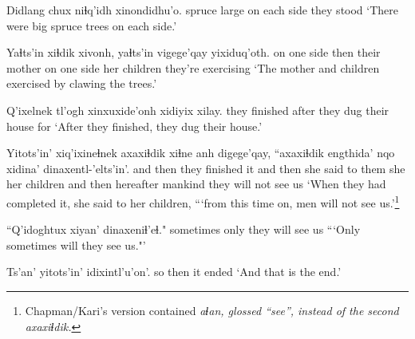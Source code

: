 \documentclass[12pt]{article}
\begin{document}
\gll Didlang chux niɬq'idh xinondidhu'o.
spruce  large {on each side} {they stood}
\glt `There were big spruce trees on each side.'
\glend 

\gll Yaɬts'in xiɬdik xivonh, yaɬts'in  vigege'qay yixiduq'oth.
{on one side} then {their mother} {on one side} {her children} {they're exercising}
\glt `The mother and children exercised by clawing the trees.'
\glend 

\gll Q'ixelnek tl'ogh  xinxuxide'onh xidiyix xilay.
{they finished} after {they dug}  {their house} for
\glt `After they finished, they dug their house.'
\glend 

\gll Yitots'in' xiq'ixineɬnek   axaxiɬdik xiɬne   anh digege'qay, ``axaxiɬdik  engthida' {nqo xidina'} dinaxentl-'elts'in'.
{and then} {they finished it}  {and then} {she said to them} she {her children} {and then}  hereafter mankind  {they will not see us}
\glt `When they had completed it, she said to her children, ```from this time on, men will not see us.'\footnote{Chapman/Kari's version contained \em aɬan\em, glossed ``see'', instead of the second \em axaxiɬdik.}
\glend 

\gll ``Q'idoghtux xiyan' dinaxeniɬ'eɬ."
sometimes only {they will see us}
\glt ```Only sometimes will they see us."'
\glend 

\gll Ts'an' yitots'in' idixintl'u'on'.
so  then  {it ended}
\glt `And that is the end.'
\glend 
\end{document}
